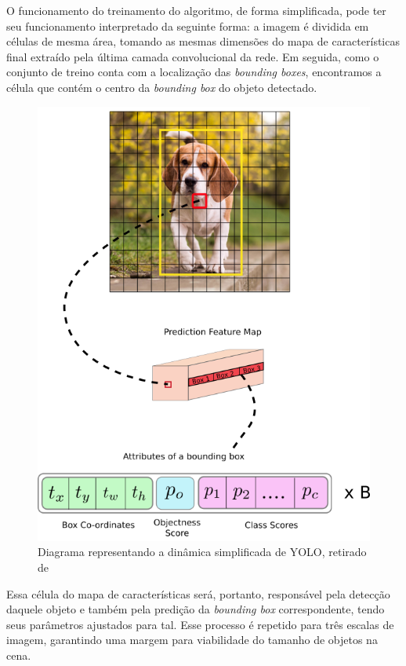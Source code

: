 \documentclass[]{politex}
\begin{document}
O funcionamento do treinamento do algoritmo, de forma simplificada, pode ter seu funcionamento interpretado da seguinte forma: a imagem é dividida em células de mesma área, tomando as mesmas dimensões do mapa de características final extraído pela última camada convolucional da rede. Em seguida, como o conjunto de treino conta com a localização das \textit{bounding boxes}, encontramos a célula que contém o centro da \textit{bounding box} do objeto detectado.

\begin{figure}[ht]
  \centering
  \includegraphics[scale=0.5]{img/yoloexplained.png}
  \caption{Diagrama representando a dinâmica simplificada de YOLO, retirado de \citeyear{yoloexplained} \citeauthor{yoloexplained}}
  \label{fig:yoloexplained}
\end{figure}

Essa célula do mapa de características será, portanto, responsável pela detecção daquele objeto e também pela predição da \textit{bounding box} correspondente, tendo seus parâmetros ajustados para tal. Esse processo é repetido para três escalas de imagem, garantindo uma margem para viabilidade do tamanho de objetos na cena.
\end{document}
